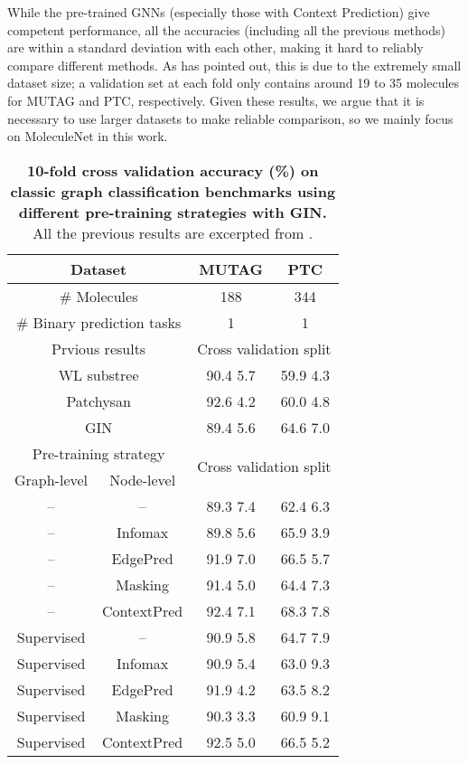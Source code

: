 \documentclass{article} \usepackage{iclr2020_conference,times}
\numberwithin{equation}{section}
\theoremstyle{plain}
\theoremstyle{definition}
\theoremstyle{remark}
\begin{document}
While the pre-trained GNNs (especially those with Context Prediction) give competent performance, all the accuracies (including all the previous methods) are within a standard deviation with each other, making it hard to reliably compare different methods.
As \citet{xu2018how} has pointed out, this is due to the extremely small dataset size; a validation set at each fold only contains around 19 to 35 molecules for MUTAG and PTC, respectively.
Given these results, we argue that it is necessary to use larger datasets to make reliable comparison, so we mainly focus on MoleculeNet \citep{wu2018moleculenet} in this work.

\begin{table}[t]
\centering
\begin{tabular}{|c|c|cc|} \hline
  \multicolumn{2}{|c|}{Dataset}        & MUTAG & PTC \\\hline
  \multicolumn{2}{|c|}{\# Molecules}  & 188  & 344  \\ 
  \multicolumn{2}{|c|}{\# Binary prediction tasks}  & 1  &  1   \\ \hline \hline
\multicolumn{2}{|c|}{Prvious results} & \multicolumn{2}{c|}{Cross validation split}  \\  \hline
\multicolumn{2}{|c|}{WL substree \citep{douglas2011weisfeiler}} & 90.4  5.7 & 59.9  4.3  \\ 
\multicolumn{2}{|c|}{Patchysan \citep{niepert2016learning}}  &  92.6  4.2 & 60.0  4.8  \\ 
\multicolumn{2}{|c|}{GIN \citep{xu2018how}}  &  89.4  5.6 & 64.6  7.0  \\ \hline 
\multicolumn{2}{|c|}{Pre-training strategy} &\multicolumn{2}{c|}{\multirow{2}{*}{Cross validation split}} \\ \cline{1-2}
Graph-level & Node-level & \multicolumn{2}{c|}{} \\ \hline
-- & -- & 89.3  7.4 & 62.4  6.3  \\ 
-- & Infomax  &  89.8  5.6 & 65.9  3.9  \\ 
-- & EdgePred & 91.9  7.0 & 66.5  5.7  \\ \hdashline
-- & Masking  &  91.4  5.0 & 64.4  7.3  \\ 
-- & ContextPred  &  92.4  7.1 & 68.3  7.8  \\ \hline
Supervised & --   &  90.9  5.8 & 64.7  7.9  \\  
Supervised & Infomax  &   90.9  5.4 & 63.0  9.3  \\ 
Supervised & EdgePred  &   91.9  4.2 & 63.5  8.2  \\ \hdashline
Supervised & Masking  & 90.3  3.3 & 60.9  9.1  \\  
Supervised & ContextPred  & 92.5  5.0 & 66.5  5.2 \\   \hline
\end{tabular}\vspace{0.2cm}
 \caption{{\bf 10-fold cross validation accuracy (\%) on classic graph classification benchmarks using different pre-training strategies with GIN.} All the previous results are excerpted from \citet{xu2018how}.}
 \label{table:result_classical_mol}
\end{table}
\end{document}
